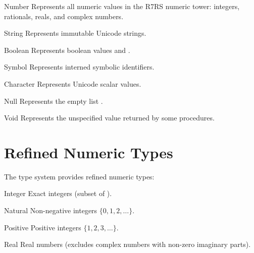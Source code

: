 \begin{typespec}{Number}
Represents all numeric values in the R7RS numeric tower: integers, rationals, reals, and complex numbers.
\end{typespec}

\begin{typespec}{String}
Represents immutable Unicode strings.
\end{typespec}

\begin{typespec}{Boolean}
Represents boolean values  and .
\end{typespec}

\begin{typespec}{Symbol}
Represents interned symbolic identifiers.
\end{typespec}

\begin{typespec}{Character}  
Represents Unicode scalar values.
\end{typespec}

\begin{typespec}{Null}
Represents the empty list \code{()}.
\end{typespec}

\begin{typespec}{Void}
Represents the unspecified value returned by some procedures.
\end{typespec}

\section{Refined Numeric Types}
\label{sec:numeric-refinements}

The type system provides refined numeric types:

\begin{typespec}{Integer}
Exact integers (subset of ).
\end{typespec}

\begin{typespec}{Natural}  
Non-negative integers $\{0, 1, 2, \ldots\}$.
\end{typespec}

\begin{typespec}{Positive}
Positive integers $\{1, 2, 3, \ldots\}$.
\end{typespec}

\begin{typespec}{Real}
Real numbers (excludes complex numbers with non-zero imaginary parts).
\end{typespec}

